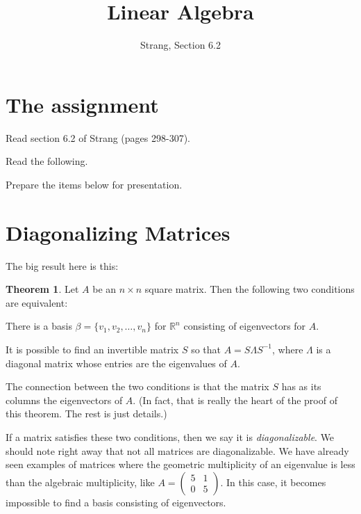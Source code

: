 \documentclass[11pt]{amsart}
\theoremstyle{definition}
\newtheorem*{theorem}{Theorem}
\begin{document}
\title{Linear Algebra}
\author{Strang, Section 6.2}
\maketitle

\section{The assignment}
\begin{compactitem}
\item Read section 6.2 of Strang (pages 298-307).
\item Read the following.
\item Prepare the items below for presentation.
\end{compactitem}


\section{Diagonalizing Matrices}

The big result here is this:

\begin{theorem} Let $A$ be an $n\times n$ square matrix. Then the following two conditions are equivalent:
\begin{compactitem}
\item There is a basis $\beta= \{ v_1, v_2, \ldots, v_n \}$ for $\mathbb{R}^n$ consisting of eigenvectors for $A$.
\item It is possible to find an invertible matrix $S$ so that $A = S \Lambda S^{-1}$, where $\Lambda$ is a diagonal matrix whose entries are the eigenvalues of $A$.
\end{compactitem}
\end{theorem}

The connection between the two conditions is that the matrix $S$ has as its columns the eigenvectors of $A$. (In fact, that is really the heart of the proof of this theorem. The rest is just details.)

If a matrix satisfies these two conditions, then we say it is \emph{diagonalizable}. We should note right away that not all matrices are diagonalizable. We have already seen examples of matrices where the geometric multiplicity of an eigenvalue is less than the algebraic multiplicity, like $A = \left( \begin{smallmatrix} 5 & 1 \\ 0 & 5 \end{smallmatrix}\right)$. In this case, it becomes impossible to find a basis consisting of eigenvectors.
\end{document}
